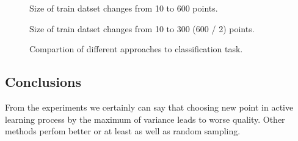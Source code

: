 \documentclass[a4paper]{article}
\begin{document}
\begin{figure}[h]
\begin{minipage}[c]{0.49\linewidth}
 Size of train datset changes from 10 to 600 points.
\end{minipage}
\vfill
\begin{minipage}[c]{0.49\linewidth}
 Size of train datset changes from 10 to 300 (600 / 2) points.
\end{minipage}
\caption{Compartion of different approaches to classification task.}
\label{Skin}
\end{figure}

\subsection{Conclusions}
From the experiments we certainly can say that choosing new point in active learning process by the maximum of variance leads to worse quality. Other methods perfom better or at least as well as random sampling.
\end{document}
